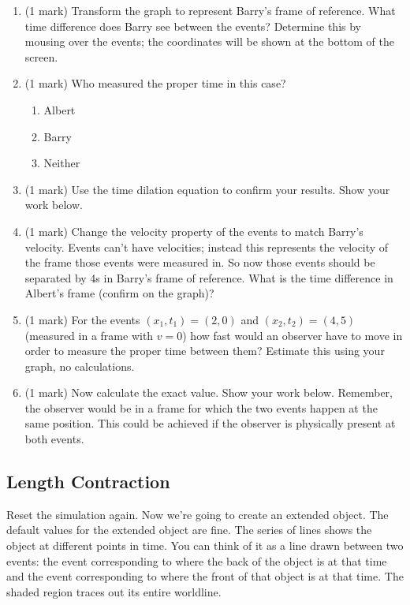 \documentclass{article}
\begin{document}
\begin{enumerate}
\item (1 mark) Transform the graph to represent Barry's frame of reference. What time difference does Barry see between the events? Determine this by mousing over the events; the coordinates will be shown at the bottom of the screen.
\vspace{2cm}
\item (1 mark) Who measured the proper time in this case?
\begin{enumerate}
\item Albert
\item Barry
\item Neither
\end{enumerate}
\item (1 mark) Use the time dilation equation to confirm your results. Show your work below.
\vspace{4cm}
\item (1 mark) Change the velocity property of the events to match Barry's velocity. Events can't have velocities; instead this represents the velocity of the frame those events were measured in. So now those events should be separated by 4s in Barry's frame of reference. What is the time difference in Albert's frame (confirm on the graph)?
\vspace{2cm}
\clearpage
\item (1 mark) For the events $(x_1,t_1)=(2,0)$ and $(x_2,t_2)=(4,5)$ (measured in a frame with $v=0$) how fast would an observer have to move in order to measure the proper time between them? Estimate this using your graph, no calculations.
\vspace{2cm}
\item (1 mark) Now calculate the exact value. Show your work below. Remember, the observer would be in a frame for which the two events happen at the same position. This could be achieved if the observer is physically present at both events.
\vspace{4cm}
\end{enumerate}

\subsection*{Length Contraction}

Reset the simulation again. Now we're going to create an extended object. The default values for the extended object are fine. The series of lines shows the object at different points in time. You can think of it as a line drawn between two events: the event corresponding to where the back of the object is at that time and the event corresponding to where the front of that object is at that time. The shaded region traces out its entire worldline.
\end{document}

